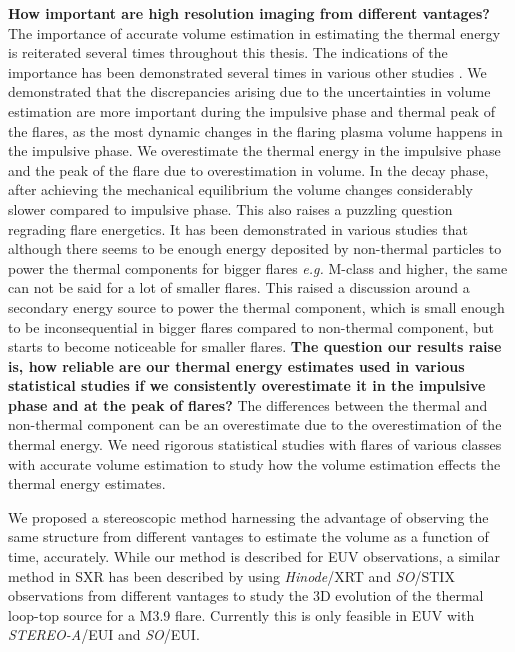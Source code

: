 \noindent
{\bf How important are high resolution imaging from different vantages?} The importance of accurate volume estimation in estimating the thermal energy is reiterated several times throughout this thesis. The indications of the importance has been demonstrated several times in various other studies \citep{hilarie05,warmuth20}. We demonstrated that the discrepancies arising due to the uncertainties in volume estimation are more important during the impulsive phase and thermal peak of the flares, as the most dynamic changes in the flaring plasma volume happens in the impulsive phase. We overestimate the thermal energy in the impulsive phase and the peak of the flare due to overestimation in volume. In the decay phase, after achieving the mechanical equilibrium the volume changes considerably slower compared to impulsive phase. This also raises a puzzling question regrading flare energetics. It has been demonstrated in various studies \citep{stosire07,emslie12,inglis14,warmuth16a,warmuth16b,ash17} that although there seems to be enough energy deposited by non-thermal particles to power the thermal components for bigger flares {\it e.g.} M-class and higher, the same can not be said for a lot of smaller flares. This raised a discussion around a secondary energy source to power the thermal component, which is small enough to be inconsequential in bigger flares compared to non-thermal component, but starts to become noticeable for smaller flares. {\bf The question our results raise is, how reliable are our thermal energy estimates used in various statistical studies if we consistently overestimate it in the impulsive phase and at the peak of flares?} The differences between the thermal and non-thermal component can be an overestimate due to the overestimation of the thermal energy. We need rigorous statistical studies with flares of various classes with accurate volume estimation to study how the volume estimation effects the thermal energy estimates.
    
We proposed a stereoscopic method harnessing the advantage of observing the same structure from different vantages to estimate the volume as a function of time, accurately. While our method is described for EUV observations, a similar method in SXR has been described by \cite{ryan24} using {\it Hinode}/XRT and {\it SO}/STIX observations from different vantages to study the 3D evolution of the thermal loop-top source for a M3.9 flare. Currently this is only feasible in EUV with {\it STEREO-A}/EUI and {\it SO}/EUI. 

